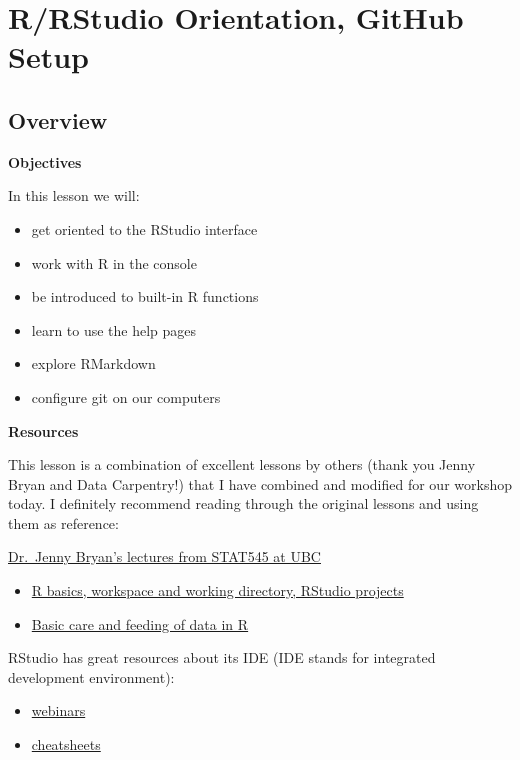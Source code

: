\documentclass[]{book}
\providecommand{\tightlist}{%
  \setlength{\itemsep}{0pt}\setlength{\parskip}{0pt}}
\theoremstyle{definition}
\theoremstyle{definition}
\theoremstyle{definition}
\theoremstyle{remark}
\begin{document}
\chapter{R/RStudio Orientation, GitHub Setup}\label{orientation}

\section{Overview}\label{overview}

\textbf{Objectives}

In this lesson we will:

\begin{itemize}
\tightlist
\item
  get oriented to the RStudio interface
\item
  work with R in the console
\item
  be introduced to built-in R functions
\item
  learn to use the help pages
\item
  explore RMarkdown
\item
  configure git on our computers
\end{itemize}

\textbf{Resources}

This lesson is a combination of excellent lessons by others (thank you
Jenny Bryan and Data Carpentry!) that I have combined and modified for
our workshop today. I definitely recommend reading through the original
lessons and using them as reference:

\href{https://stat545-ubc.github.io/}{Dr.~Jenny Bryan's lectures from
STAT545 at UBC}

\begin{itemize}
\tightlist
\item
  \href{http://stat545-ubc.github.io/block002_hello-r-workspace-wd-project.html}{R
  basics, workspace and working directory, RStudio projects}
\item
  \href{http://stat545-ubc.github.io/block006_care-feeding-data.html}{Basic
  care and feeding of data in R}
\end{itemize}

RStudio has great resources about its IDE (IDE stands for integrated
development environment):

\begin{itemize}
\tightlist
\item
  \href{https://www.rstudio.com/resources/webinars/}{webinars}
\item
  \href{https://www.rstudio.com/resources/cheatsheets/}{cheatsheets}
\end{itemize}
\end{document}
